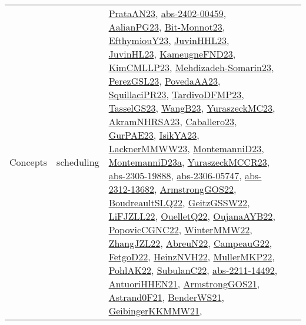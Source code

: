 {\begin{longtable}{lp{3cm}>{\raggedright}p{6cm}>{\raggedright}p{6cm}p{8cm}}
Concepts & scheduling & \href{articles/PrataAN23.pdf}{PrataAN23}\cite{PrataAN23}, \href{articles/abs-2402-00459.pdf}{abs-2402-00459}\cite{abs-2402-00459}, \href{papers/AalianPG23.pdf}{AalianPG23}\cite{AalianPG23}, \href{papers/Bit-Monnot23.pdf}{Bit-Monnot23}\cite{Bit-Monnot23}, \href{papers/EfthymiouY23.pdf}{EfthymiouY23}\cite{EfthymiouY23}, \href{papers/JuvinHHL23.pdf}{JuvinHHL23}\cite{JuvinHHL23}, \href{papers/JuvinHL23.pdf}{JuvinHL23}\cite{JuvinHL23}, \href{papers/KameugneFND23.pdf}{KameugneFND23}\cite{KameugneFND23}, \href{papers/KimCMLLP23.pdf}{KimCMLLP23}\cite{KimCMLLP23}, \href{papers/Mehdizadeh-Somarin23.pdf}{Mehdizadeh-Somarin23}\cite{Mehdizadeh-Somarin23}, \href{papers/PerezGSL23.pdf}{PerezGSL23}\cite{PerezGSL23}, \href{papers/PovedaAA23.pdf}{PovedaAA23}\cite{PovedaAA23}, \href{papers/SquillaciPR23.pdf}{SquillaciPR23}\cite{SquillaciPR23}, \href{papers/TardivoDFMP23.pdf}{TardivoDFMP23}\cite{TardivoDFMP23}, \href{papers/TasselGS23.pdf}{TasselGS23}\cite{TasselGS23}, \href{papers/WangB23.pdf}{WangB23}\cite{WangB23}, \href{papers/YuraszeckMC23.pdf}{YuraszeckMC23}\cite{YuraszeckMC23}, \href{articles/AkramNHRSA23.pdf}{AkramNHRSA23}\cite{AkramNHRSA23}, \href{articles/Caballero23.pdf}{Caballero23}\cite{Caballero23}, \href{articles/GurPAE23.pdf}{GurPAE23}\cite{GurPAE23}, \href{articles/IsikYA23.pdf}{IsikYA23}\cite{IsikYA23}, \href{articles/LacknerMMWW23.pdf}{LacknerMMWW23}\cite{LacknerMMWW23}, \href{articles/MontemanniD23.pdf}{MontemanniD23}\cite{MontemanniD23}, \href{articles/MontemanniD23a.pdf}{MontemanniD23a}\cite{MontemanniD23a}, \href{articles/YuraszeckMCCR23.pdf}{YuraszeckMCCR23}\cite{YuraszeckMCCR23}, \href{articles/abs-2305-19888.pdf}{abs-2305-19888}\cite{abs-2305-19888}, \href{articles/abs-2306-05747.pdf}{abs-2306-05747}\cite{abs-2306-05747}, \href{articles/abs-2312-13682.pdf}{abs-2312-13682}\cite{abs-2312-13682}, \href{papers/ArmstrongGOS22.pdf}{ArmstrongGOS22}\cite{ArmstrongGOS22}, \href{papers/BoudreaultSLQ22.pdf}{BoudreaultSLQ22}\cite{BoudreaultSLQ22}, \href{papers/GeitzGSSW22.pdf}{GeitzGSSW22}\cite{GeitzGSSW22}, \href{papers/LiFJZLL22.pdf}{LiFJZLL22}\cite{LiFJZLL22}, \href{papers/OuelletQ22.pdf}{OuelletQ22}\cite{OuelletQ22}, \href{papers/OujanaAYB22.pdf}{OujanaAYB22}\cite{OujanaAYB22}, \href{papers/PopovicCGNC22.pdf}{PopovicCGNC22}\cite{PopovicCGNC22}, \href{papers/WinterMMW22.pdf}{WinterMMW22}\cite{WinterMMW22}, \href{papers/ZhangJZL22.pdf}{ZhangJZL22}\cite{ZhangJZL22}, \href{articles/AbreuN22.pdf}{AbreuN22}\cite{AbreuN22}, \href{articles/CampeauG22.pdf}{CampeauG22}\cite{CampeauG22}, \href{articles/FetgoD22.pdf}{FetgoD22}\cite{FetgoD22}, \href{articles/HeinzNVH22.pdf}{HeinzNVH22}\cite{HeinzNVH22}, \href{articles/MullerMKP22.pdf}{MullerMKP22}\cite{MullerMKP22}, \href{articles/PohlAK22.pdf}{PohlAK22}\cite{PohlAK22}, \href{articles/SubulanC22.pdf}{SubulanC22}\cite{SubulanC22}, \href{articles/abs-2211-14492.pdf}{abs-2211-14492}\cite{abs-2211-14492}, \href{papers/AntuoriHHEN21.pdf}{AntuoriHHEN21}\cite{AntuoriHHEN21}, \href{papers/ArmstrongGOS21.pdf}{ArmstrongGOS21}\cite{ArmstrongGOS21}, \href{papers/Astrand0F21.pdf}{Astrand0F21}\cite{Astrand0F21}, \href{papers/BenderWS21.pdf}{BenderWS21}\cite{BenderWS21}, \href{papers/GeibingerKKMMW21.pdf}{GeibingerKKMMW21}\cite{GeibingerKKMMW21}, 
\end{longtable}}
